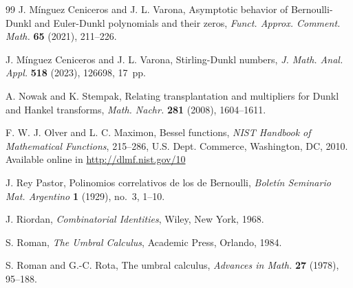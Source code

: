 \documentclass[11pt]{article}
\theoremstyle{plain}
\theoremstyle{remark}
\numberwithin{equation}{section} %
\begin{document}
\begin{thebibliography}{99}
J. M\'inguez Ceniceros and J. L. Varona,
Asymptotic behavior of Bernoulli-Dunkl and Euler-Dunkl polynomials and their zeros,
\textit{Funct. Approx. Comment. Math.} \textbf{65} (2021), 211--226.

J. M\'inguez Ceniceros and J. L. Varona,
Stirling-Dunkl numbers,
\textit{J. Math. Anal. Appl.} \textbf{518} (2023), 126698, 17~pp.




A. Nowak and K. Stempak, 
Relating transplantation and multipliers for Dunkl and Hankel transforms, 
\textit{Math. Nachr.} 
\textbf{281} (2008), 1604--1611. 

F. W. J. Olver and L. C. Maximon,
Bessel functions,
\textit{NIST Handbook of Mathematical Functions},
215--286, %
U.S. Dept. Commerce, Washington, DC, 2010.
Available online in \url{http://dlmf.nist.gov/10}


{J. Rey Pastor},
Polinomios correlativos de los de Bernoulli,
\textit{Bolet\'in Seminario Mat. Argentino}
\textbf{1} (1929), no.~3, 1--10.

J. Riordan, 
\textit{Combinatorial Identities}, 
Wiley, New York, 1968.

S. Roman,
\textit{The Umbral Calculus},
Academic Press, Orlando, 1984.

S. Roman and G.-C. Rota, %
{The umbral calculus},
\textit{Advances in Math.} \textbf{27} (1978), 95--188. %


\end{thebibliography}
\end{document}
